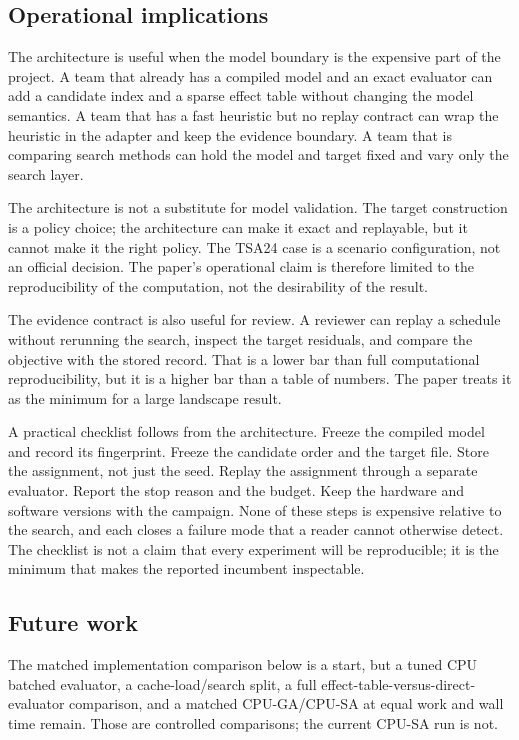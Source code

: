 \documentclass[preprint,11pt]{elsarticle}
\begin{document}
\subsection{Operational implications}

The architecture is useful when the model boundary is the expensive part of the project. A team that
already has a compiled model and an exact evaluator can add a candidate index and a sparse effect
table without changing the model semantics. A team that has a fast heuristic but no replay contract
can wrap the heuristic in the adapter and keep the evidence boundary. A team that is comparing search
methods can hold the model and target fixed and vary only the search layer.

The architecture is not a substitute for model validation. The target construction is a policy choice;
the architecture can make it exact and replayable, but it cannot make it the right policy. The TSA24
case is a scenario configuration, not an official decision. The paper's operational claim is therefore
limited to the reproducibility of the computation, not the desirability of the result.

The evidence contract is also useful for review. A reviewer can replay a schedule without rerunning
the search, inspect the target residuals, and compare the objective with the stored record. That is a
lower bar than full computational reproducibility, but it is a higher bar than a table of numbers. The
paper treats it as the minimum for a large landscape result.

A practical checklist follows from the architecture. Freeze the compiled model and record its
fingerprint. Freeze the candidate order and the target file. Store the assignment, not just the seed.
Replay the assignment through a separate evaluator. Report the stop reason and the budget. Keep the
hardware and software versions with the campaign. None of these steps is expensive relative to the
search, and each closes a failure mode that a reader cannot otherwise detect. The checklist is not a
claim that every experiment will be reproducible; it is the minimum that makes the reported incumbent
inspectable.

\subsection{Future work}

The matched implementation comparison below is a start, but a tuned CPU batched evaluator, a
cache-load/search split, a full effect-table-versus-direct-evaluator comparison, and a matched
CPU-GA/CPU-SA at equal work and wall time remain. Those are controlled comparisons; the current
CPU-SA run is not.
\end{document}
